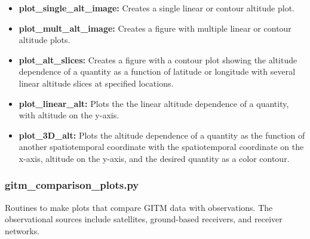 \begin{itemize}
\item[]{{\bf plot\_single\_alt\_image:}  Creates a single linear or contour altitude plot.}
\item[]{{\bf plot\_mult\_alt\_image:}  Creates a figure with multiple linear or contour altitude plots.}
\item[]{{\bf plot\_alt\_slices:}  Creates a figure with a contour plot showing the altitude dependence of a quantity as a function of latitude or longitude with several linear altitude slices at specified locations.}
\item[]{{\bf plot\_linear\_alt:}  Plots the the linear altitude dependence of a quantity, with altitude on the y-axis.}
\item[]{{\bf plot\_3D\_alt:}  Plots the altitude dependence of a quantity as the function of another spatiotemporal coordinate with the spatiotemporal coordinate on the x-axis, altitude on the y-axis, and the desired quantity as a color contour.}
\end{itemize}

\subsubsection{gitm\_comparison\_plots.py}

Routines to make plots that compare GITM data with observations.  The observational sources include satellites, ground-based receivers, and receiver networks.

